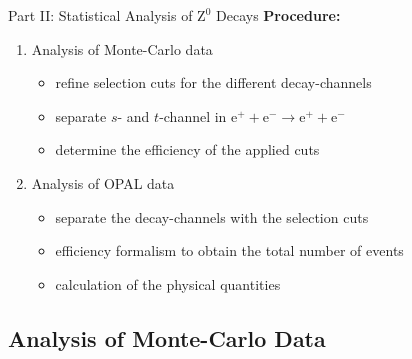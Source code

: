 \documentclass[11pt,xcolor=dvipsnames,professionalfonts]{beamer}
\begin{document}
\begin{frame}{Part II: Statistical Analysis of $\mathrm{Z}^0$ Decays}
	\textbf{Procedure:}
	\begin{enumerate}
		\setlength\itemsep{2.em}
		\item Analysis of Monte-Carlo data
		\begin{itemize}
			\setlength\itemsep{0.5em}
			\item refine selection cuts for the different decay-channels
			
			\item separate $s$- and $t$-channel in $\mathrm{e}^+ + \mathrm{e}^- \rightarrow \mathrm{e}^+ + \mathrm{e}^-$
			
			\item determine the efficiency of the applied cuts
		\end{itemize}
		
		\item Analysis of OPAL data
		\begin{itemize}
			\setlength\itemsep{0.5em}
			\item separate the decay-channels with the selection cuts
			
			\item efficiency formalism to obtain the total number of events
			
			\item calculation of the physical quantities
		\end{itemize}
	\end{enumerate}
\end{frame}

\subsection{Analysis of Monte-Carlo Data}
\end{document}

